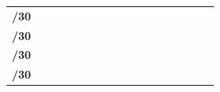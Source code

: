 \documentclass[11pt,a4paper]{report}
\begin{document}
\begin{longtable}[c]{rcccccccccccccccc}
        \endhead
        \hline
        \endfoot
        \endlastfoot
        \textbf{/30}                                                                               &                               &                                &                                &                               &                                &                               &                                &                               &                             &                             &                             &                             &                             &                             & \cellcolor[HTML]{C09FE5}    & \cellcolor[HTML]{C09FE5}    \\
        \textbf{/30}                                                                               &                               &                                &                                &                               &                                &                               &                                &                               &                             &                             &                             &                             & \cellcolor[HTML]{C09FE5}    & \cellcolor[HTML]{C09FE5}    &                             &                             \\
        \textbf{/30}                                                                               &                               &                                &                                &                               &                                &                               &                                &                               &                             &                             & \cellcolor[HTML]{C09FE5}    & \cellcolor[HTML]{C09FE5}    &                             &                             &                             &                             \\
        \textbf{/30}                                                                               &                               &                                &                                &                               &                                &                               &                                &                               & \cellcolor[HTML]{C09FE5}    & \cellcolor[HTML]{C09FE5}    &                             &                             &                             &                             &                             &                             \\

\end{longtable}
\end{document}
